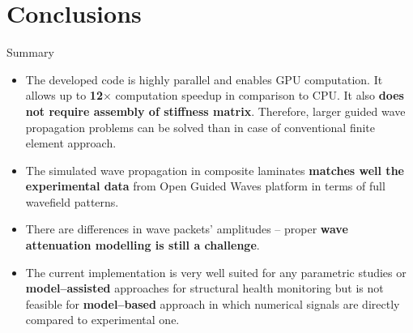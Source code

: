 \documentclass[10pt]{beamer} %
\begin{document}
\section{Conclusions}
\begin{frame}{Summary}
	\begin{itemize}
		\item The developed code is highly parallel and enables GPU computation. It allows up to \textbf{12$\times$} computation speedup in comparison to CPU. It also \textbf{does not require assembly of stiffness matrix}. Therefore, larger guided wave propagation problems can be solved than in case of conventional finite element approach.
		\item The simulated wave propagation in composite laminates \textbf{matches well the experimental data} from Open Guided Waves platform in terms of full wavefield patterns.
		\item There are differences in wave packets' amplitudes -- proper \textbf{wave attenuation modelling is still a challenge}.
		\item The current implementation is very well suited for any parametric studies or \textbf{model--assisted} approaches for structural health monitoring but is not feasible for \textbf{model--based} approach in which numerical signals are directly compared to experimental one.
		
	\end{itemize}	
\end{frame}
\end{document}
